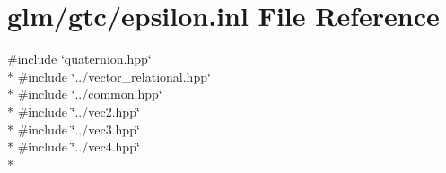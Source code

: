 \hypertarget{epsilon_8inl}{\section{glm/gtc/epsilon.inl File Reference}
\label{epsilon_8inl}
}
{\ttfamily \#include \char`\"{}quaternion.\-hpp\char`\"{}}\\*
{\ttfamily \#include \char`\"{}../vector\-\_\-relational.\-hpp\char`\"{}}\\*
{\ttfamily \#include \char`\"{}../common.\-hpp\char`\"{}}\\*
{\ttfamily \#include \char`\"{}../vec2.\-hpp\char`\"{}}\\*
{\ttfamily \#include \char`\"{}../vec3.\-hpp\char`\"{}}\\*
{\ttfamily \#include \char`\"{}../vec4.\-hpp\char`\"{}}\\*
